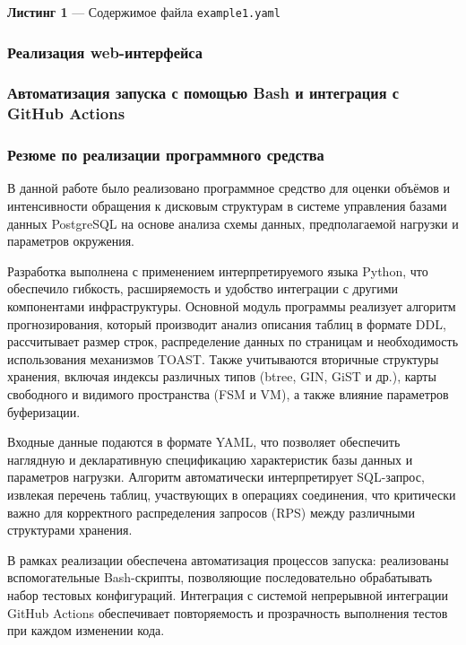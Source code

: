 \begin{center}
\textbf{Листинг 1} --- Содержимое файла \texttt{example1.yaml}
\end{center}




\subsubsection{Реализация web-интерфейса}

\subsubsection{Автоматизация запуска с помощью Bash и интеграция с GitHub Actions}


\subsubsection{Резюме по реализации программного средства}

В данной работе было реализовано программное средство для оценки объёмов и интенсивности обращения к дисковым структурам в системе управления базами данных PostgreSQL на основе анализа схемы данных, предполагаемой нагрузки и параметров окружения.

Разработка выполнена с применением интерпретируемого языка Python, что обеспечило гибкость, расширяемость и удобство интеграции с другими компонентами инфраструктуры. Основной модуль программы реализует алгоритм прогнозирования, который производит анализ описания таблиц в формате DDL, рассчитывает размер строк, распределение данных по страницам и необходимость использования механизмов TOAST. Также учитываются вторичные структуры хранения, включая индексы различных типов (btree, GIN, GiST и др.), карты свободного и видимого пространства (FSM и VM), а также влияние параметров буферизации.

Входные данные подаются в формате YAML, что позволяет обеспечить наглядную и декларативную спецификацию характеристик базы данных и параметров нагрузки. Алгоритм автоматически интерпретирует SQL-запрос, извлекая перечень таблиц, участвующих в операциях соединения, что критически важно для корректного распределения запросов (RPS) между различными структурами хранения.

В рамках реализации обеспечена автоматизация процессов запуска: реализованы вспомогательные Bash-скрипты, позволяющие последовательно обрабатывать набор тестовых конфигураций. Интеграция с системой непрерывной интеграции GitHub Actions обеспечивает повторяемость и прозрачность выполнения тестов при каждом изменении кода.


